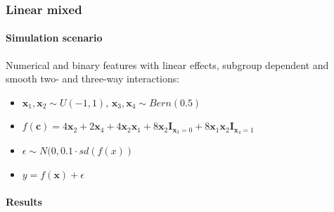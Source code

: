 \subsubsection{Linear mixed}
\paragraph{Simulation scenario}
Numerical and binary features with linear effects, subgroup dependent and smooth two- and three-way interactions:
\begin{itemize}
    \item $\textbf{x}_1, \textbf{x}_2 \sim U(-1,1)$, $\textbf{x}_3, \textbf{x}_4 \sim Bern(0.5)$
    \item $f(\textbf{c}) = 4   \textbf{x}_2 + 2   \textbf{x}_4  + 4   \textbf{x}_2   \textbf{x}_1 + 8   \textbf{x}_2   \mathbf{I}_{\textbf{x}_3 = 0} +  8 \textbf{x}_1   \textbf{x}_2 \mathbf{I}_{\textbf{x}_4 = 1}$
    \item $\epsilon \sim N(0, 0.1 \cdot sd(f(x))$
    \item $y = f(\textbf{x}) + \epsilon$
\end{itemize}


\paragraph{Results}


